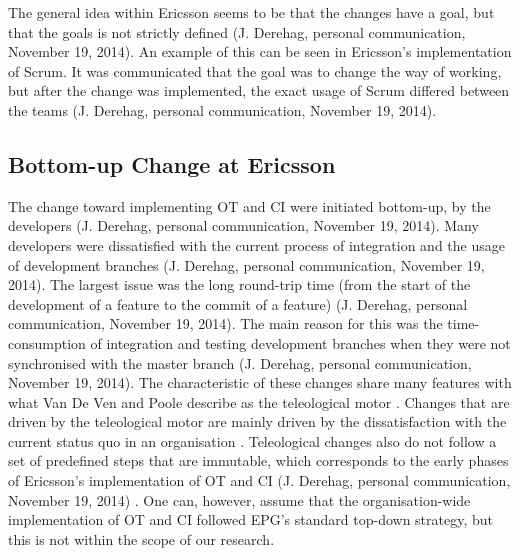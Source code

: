 \documentclass[final_report_innit.tex]{subfiles}
\begin{document}
The general idea within Ericsson seems to be that the changes have a goal, but that the goals is not strictly defined (J. Derehag, personal communication, November 19, 2014). An example of this can be seen in Ericsson’s implementation of Scrum. It was communicated that the goal was to change the way of working, but after the change was implemented, the exact usage of Scrum differed between the teams (J. Derehag, personal communication, November 19, 2014). 

\subsection*{Bottom-up Change at Ericsson}
The change toward implementing OT and CI were initiated bottom-up, by the developers (J. Derehag, personal communication, November 19, 2014). Many developers were dissatisfied with the current process of integration and the usage of development branches (J. Derehag, personal communication, November 19, 2014). The largest issue was the long round-trip time (from the start of the development of a feature to the commit of a feature) (J. Derehag, personal communication, November 19, 2014). The main reason for this was the time-consumption of integration and testing development branches when they were not synchronised with the master branch (J. Derehag, personal communication, November 19, 2014). The characteristic of these changes share many features with what Van De Ven and Poole describe as the teleological motor \cite{van1995explaining}. Changes that are driven by the teleological motor are mainly driven by the dissatisfaction with the current status quo in an organisation \cite{van1995explaining}. Teleological changes also do not follow a set of predefined steps that are immutable, which corresponds to the early phases of Ericsson’s implementation of OT and CI (J. Derehag, personal communication, November 19, 2014) \cite{van1995explaining}. One can, however, assume that the organisation-wide implementation of OT and CI followed EPG’s standard top-down strategy, but this is not within the scope of our research.
\end{document}
